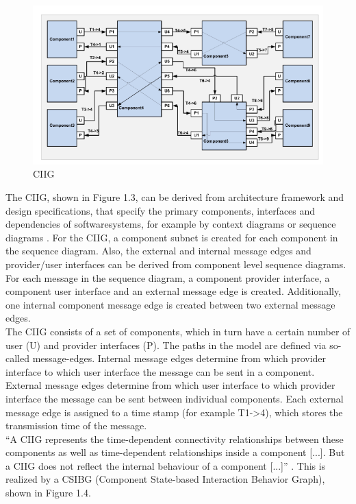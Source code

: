 \begin{figure}[H]
\centering{}\includegraphics{../images/CIIG}\caption{CIIG \cite{Guan2015}}
\end{figure}
The CIIG, shown in Figure 1.3, can be derived from architecture framework
and design specifications, that specify the primary components, interfaces
and dependencies of softwaresystems, for example by context diagrams
or sequence diagrams \cite{Guan2015}. For the CIIG, a component subnet
is created for each component in the sequence diagram. Also, the external
and internal message edges and provider/user interfaces can be derived
from component level sequence diagrams. For each message in the sequence
diagram, a component provider interface, a component user interface
and an external message edge is created. Additionally, one internal
component message edge is created between two external message edges.\\
The CIIG consists of a set of components, which in turn have a certain
number of user (U) and provider interfaces (P). The paths in the model
are defined via so-called message-edges. Internal message edges determine
from which provider interface to which user interface the message
can be sent in a component. External message edges determine from
which user interface to which provider interface the message can be
sent between individual components. Each external message edge is
assigned to a time stamp (for example T1-\textgreater 4), which stores
the transmission time of the message. \\
\enquote{A CIIG represents the time-dependent connectivity relationships
between these components as well as time-dependent relationships inside
a component {[}...{]}. But a CIIG does not reflect the internal behaviour
of a component {[}...{]}} \cite{Guan2015}. This is realized
by a CSIBG (Component State-based Interaction Behavior Graph), shown
in Figure 1.4.

